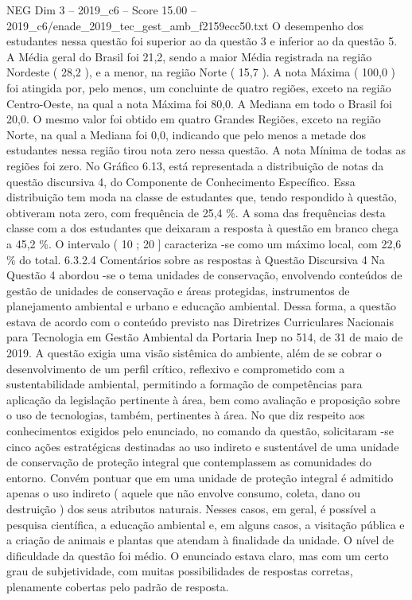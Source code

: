 \begin{textsample}{NEG Dim 3 – 2019\_c6 – Score 15.00 – 2019\_c6/enade\_2019\_tec\_gest\_amb\_f2159ecc50.txt}
O desempenho dos estudantes nessa questão foi superior ao da questão 3 e inferior ao da questão 5.
A Média geral do Brasil foi 21,2, sendo a maior Média registrada na região Nordeste ( 28,2 ), e a menor, na região Norte ( 15,7 ).
A nota Máxima ( 100,0 ) foi atingida por, pelo menos, um concluinte de quatro regiões, exceto na região Centro-Oeste, na qual a nota Máxima foi 80,0.
A Mediana em todo o Brasil foi 20,0.
O mesmo valor foi obtido em quatro Grandes Regiões, exceto na região Norte, na qual a Mediana foi 0,0, indicando que pelo menos a metade dos estudantes nessa região tirou nota zero nessa questão.
A nota Mínima de todas as regiões foi zero.
No Gráfico 6.13, está representada a distribuição de notas da questão discursiva 4, do Componente de Conhecimento Específico.
Essa distribuição tem moda na classe de estudantes que, tendo respondido à questão, obtiveram nota zero, com frequência de 25,4 \%.
A soma das frequências desta classe com a dos estudantes que deixaram a resposta à questão em branco chega a 45,2 \%.
O intervalo ( 10 ; 20 ] caracteriza -se como um máximo local, com 22,6 \% do total. 6.3.2.4 Comentários sobre as respostas à Questão Discursiva 4 Na Questão 4 abordou -se o tema unidades de conservação, envolvendo conteúdos de gestão de unidades de conservação e áreas protegidas, instrumentos de planejamento ambiental e urbano e educação ambiental.
Dessa forma, a questão estava de acordo com o conteúdo previsto nas Diretrizes Curriculares Nacionais para Tecnologia em Gestão Ambiental da Portaria Inep no 514, de 31 de maio de 2019.
A questão exigia uma visão sistêmica do ambiente, além de se cobrar o desenvolvimento de um perfil crítico, reflexivo e comprometido com a sustentabilidade ambiental, permitindo a formação de competências para aplicação da legislação pertinente à área, bem como avaliação e proposição sobre o uso de tecnologias, também, pertinentes à área.
No que diz respeito aos conhecimentos exigidos pelo enunciado, no comando da questão, solicitaram -se cinco ações estratégicas destinadas ao uso indireto e sustentável de uma unidade de conservação de proteção integral que contemplassem as comunidades do entorno.
Convém pontuar que em uma unidade de proteção integral é admitido apenas o uso indireto ( aquele que não envolve consumo, coleta, dano ou destruição ) dos seus atributos naturais.
Nesses casos, em geral, é possível a pesquisa científica, a educação ambiental e, em alguns casos, a visitação pública e a criação de animais e plantas que atendam à finalidade da unidade.
O nível de dificuldade da questão foi médio.
O enunciado estava claro, mas com um certo grau de subjetividade, com muitas possibilidades de respostas corretas, plenamente cobertas pelo padrão de resposta.

\end{textsample}
